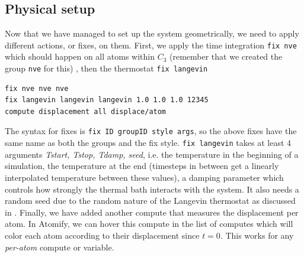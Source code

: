 \documentclass[12pt,a4paper,final]{iopart}
\newcommand{\code}[1]{\colorbox{light-gray}{\color{RawSienna}\texttt{#1}}}
\begin{document}
\subsection{Physical setup}
Now that we have managed to set up the system geometrically, 
we need to apply different actions, or fixes, on them.
First, we apply the time integration \code{fix nve} which
should happen on all atoms within $C_3$ (remember that we created the group \code{nve} for this)
, then the thermostat \code{fix langevin}

\begin{lstlisting}
fix nve nve nve
fix langevin langevin langevin 1.0 1.0 1.0 12345
compute displacement all displace/atom
\end{lstlisting}

The syntax for fixes is \code{fix ID groupID style args}, so the above fixes have the same name as both the groups and the fix style.
\code{fix langevin} takes at least 4 arguments \textit{Tstart, Tstop, Tdamp, seed}, i.e.
the temperature in the beginning of a simulation, the temperature at the end (timesteps in between get a linearly
interpolated temperature between these values), a damping parameter which controls how strongly the thermal bath interacts with the system.
It also needs a random seed due to the random nature of the Langevin thermostat as discussed in \cite{schneider1978molecular}.
Finally, we have added another compute that measures the displacement per atom.
In Atomify, we can hover this compute in the list of computes which will color each atom according to their displacement since $t=0$.
This works for any \textit{per-atom} compute or variable.
\end{document}
